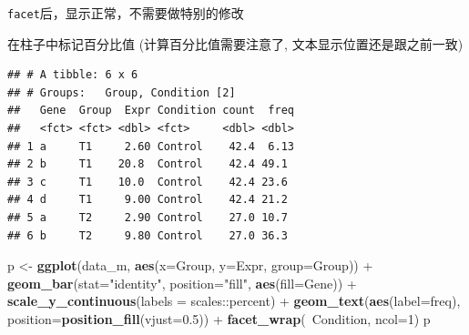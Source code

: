 \documentclass[]{article}
\newenvironment{Shaded}{\begin{snugshade}}{\end{snugshade}}
\newcommand{\KeywordTok}[1]{\textcolor[rgb]{0.13,0.29,0.53}{\textbf{{#1}}}}
\newcommand{\DataTypeTok}[1]{\textcolor[rgb]{0.13,0.29,0.53}{{#1}}}
\newcommand{\DecValTok}[1]{\textcolor[rgb]{0.00,0.00,0.81}{{#1}}}
\newcommand{\FloatTok}[1]{\textcolor[rgb]{0.00,0.00,0.81}{{#1}}}
\newcommand{\StringTok}[1]{\textcolor[rgb]{0.31,0.60,0.02}{{#1}}}
\newcommand{\CommentTok}[1]{\textcolor[rgb]{0.56,0.35,0.01}{\textit{{#1}}}}
\newcommand{\NormalTok}[1]{{#1}}
\numberwithin{figure}{section}
\numberwithin{table}{section}
\theoremstyle{definition}
\theoremstyle{definition}
\theoremstyle{definition}
\theoremstyle{remark}
\begin{document}
\texttt{facet}后，显示正常，不需要做特别的修改

在柱子中标记百分比值 (计算百分比值需要注意了,
文本显示位置还是跟之前一致)

\begin{Shaded}
\end{Shaded}

\begin{verbatim}
## # A tibble: 6 x 6
## # Groups:   Group, Condition [2]
##   Gene  Group  Expr Condition count  freq
##   <fct> <fct> <dbl> <fct>     <dbl> <dbl>
## 1 a     T1     2.60 Control    42.4  6.13
## 2 b     T1    20.8  Control    42.4 49.1 
## 3 c     T1    10.0  Control    42.4 23.6 
## 4 d     T1     9.00 Control    42.4 21.2 
## 5 a     T2     2.90 Control    27.0 10.7 
## 6 b     T2     9.80 Control    27.0 36.3
\end{verbatim}

\begin{Shaded}
\begin{Highlighting}[]
\NormalTok{p <-}\StringTok{ }\KeywordTok{ggplot}\NormalTok{(data_m, }\KeywordTok{aes}\NormalTok{(}\DataTypeTok{x=}\NormalTok{Group, }\DataTypeTok{y=}\NormalTok{Expr, }\DataTypeTok{group=}\NormalTok{Group)) +}
\StringTok{    }\KeywordTok{geom_bar}\NormalTok{(}\DataTypeTok{stat=}\StringTok{"identity"}\NormalTok{, }\DataTypeTok{position=}\StringTok{"fill"}\NormalTok{, }\KeywordTok{aes}\NormalTok{(}\DataTypeTok{fill=}\NormalTok{Gene)) +}
\StringTok{    }\KeywordTok{scale_y_continuous}\NormalTok{(}\DataTypeTok{labels =} \NormalTok{scales::percent) +}
\StringTok{    }\KeywordTok{geom_text}\NormalTok{(}\KeywordTok{aes}\NormalTok{(}\DataTypeTok{label=}\NormalTok{freq), }\DataTypeTok{position=}\KeywordTok{position_fill}\NormalTok{(}\DataTypeTok{vjust=}\FloatTok{0.5}\NormalTok{)) +}
\StringTok{    }\KeywordTok{facet_wrap}\NormalTok{(~Condition, }\DataTypeTok{ncol=}\DecValTok{1}\NormalTok{)}
\NormalTok{p}
\end{Highlighting}
\end{Shaded}
\end{document}

